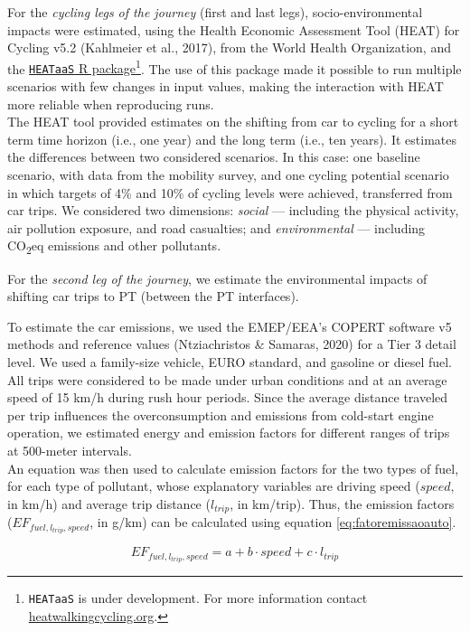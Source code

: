 \documentclass[review, doubleblind, 3p,
authoryear]{elsarticle} %
\begin{document}
For the \emph{cycling legs of the journey} (first and last legs),
socio-environmental impacts were estimated, using the Health Economic
Assessment Tool (HEAT) for Cycling v5.2 (Kahlmeier et al., 2017), from
the World Health Organization, and the
\href{https://github.com/HEAT-WHO/HEAT_heatr_api}{\texttt{HEATaaS} R
package}\footnote{\texttt{HEATaaS} is under development. For more
  information contact
  \href{https://heatwalkingcycling.org}{heatwalkingcycling.org}.}. The
use of this package made it possible to run multiple scenarios with few
changes in input values, making the interaction with HEAT more reliable
when reproducing runs.\\
The HEAT tool provided estimates on the shifting from car to cycling for
a short term time horizon (i.e., one year) and the long term (i.e., ten
years). It estimates the differences between two considered scenarios.
In this case: one baseline scenario, with data from the mobility survey,
and one cycling potential scenario in which targets of 4\% and 10\% of
cycling levels were achieved, transferred from car trips. We considered
two dimensions: \emph{social} --- including the physical activity, air
pollution exposure, and road casualties; and \emph{environmental} ---
including CO\textsubscript{2}eq emissions and other pollutants.

For the \emph{second leg of the journey}, we estimate the environmental
impacts of shifting car trips to PT (between the PT interfaces).

To estimate the car emissions, we used the EMEP/EEA's COPERT software v5
methods and reference values (Ntziachristos \& Samaras, 2020) for a Tier
3 detail level. We used a family-size vehicle, EURO standard, and
gasoline or diesel fuel. All trips were considered to be made under
urban conditions and at an average speed of 15 km/h during rush hour
periods. Since the average distance traveled per trip influences the
overconsumption and emissions from cold-start engine operation, we
estimated energy and emission factors for different ranges of trips at
500-meter intervals.\\
An equation was then used to calculate emission factors for the two
types of fuel, for each type of pollutant, whose explanatory variables
are driving speed (\(speed\), in km/h) and average trip distance
(\(l_{trip}\), in km/trip). Thus, the emission factors
(\(EF_{fuel,l_{trip},speed}\), in g/km) can be calculated using equation
\ref{eq:fatoremissaoauto}.

\begin{equation}\label{eq:fatoremissaoauto}
{EF}_{fuel,l_{trip},speed} = a + b\cdot {speed} + c\cdot l_{trip}
\end{equation}
\end{document}
